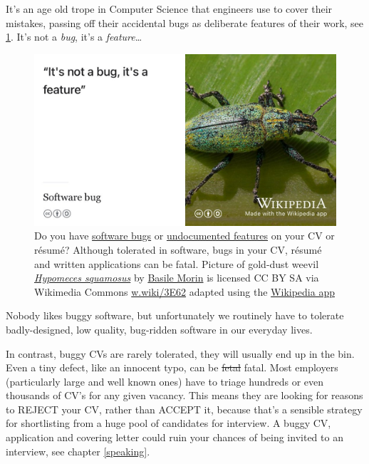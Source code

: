 \documentclass[
]{book}
\begin{document}
It's an age old trope in Computer Science that engineers use to cover their mistakes, passing off their accidental bugs as deliberate features of their work, see \ref{fig:notabug-fig}. It's not a \emph{bug}, it's a \emph{feature}\ldots{}

\begin{figure}

{\centering \includegraphics[width=0.99\linewidth]{images/notabug} 

}

\caption{Do you have \href{https://en.wikipedia.org/wiki/Software_bug}{software bugs} or \href{https://en.wikipedia.org/wiki/Undocumented_feature}{undocumented features} on your CV or résumé? Although tolerated in software, bugs in your CV, résumé and written applications can be fatal. Picture of gold-dust weevil \emph{\href{https://en.wikipedia.org/wiki/Hypomeces_squamosus}{Hypomeces squamosus}} by \href{https://commons.wikimedia.org/wiki/User:Basile_Morin}{Basile Morin} is licensed CC BY SA via Wikimedia Commons \href{https://w.wiki/3E62}{w.wiki/3E62} adapted using the \href{https://apps.apple.com/us/app/wikipedia/id324715238}{Wikipedia app}}\label{fig:notabug-fig}
\end{figure}



Nobody likes buggy software, but unfortunately we routinely have to tolerate badly-designed, low quality, bug-ridden software in our everyday lives. \citep{badsoftware, failware}

In contrast, buggy CVs are rarely tolerated, they will usually end up in the bin. Even a tiny defect, like an innocent typo, can be \sout{fetal} fatal. Most employers (particularly large and well known ones) have to triage hundreds or even thousands of CV's for any given vacancy. This means they are looking for reasons to REJECT your CV, rather than ACCEPT it, because that's a sensible strategy for shortlisting from a huge pool of candidates for interview. A buggy CV, application and covering letter could ruin your chances of being invited to an interview, see chapter \ref{speaking}.
\end{document}
